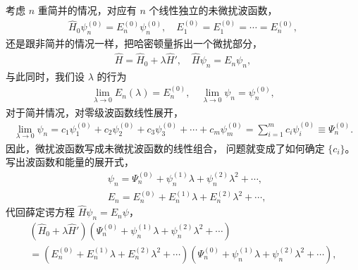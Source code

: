 考虑 $n$ 重简并的情况，对应有 $n$ 个线性独立的未微扰波函数，
\begin{align}
    \hat H_0 \psi_n^{(0)} = E_n^{(0)} \psi_n^{(0)}, \quad 
    E_1^{(0)} = E_1^{(0)} = \cdots = E_n^{(0)}, 
\end{align}
还是跟非简并的情况一样，把哈密顿量拆出一个微扰部分，
\begin{align}
    \hat H = \hat H_0 + \lambda \hat H', \quad \hat H \psi_n = E_n \psi_n, 
\end{align}
与此同时，我们设 $\lambda$ 的行为
\begin{align}
    \lim_{\lambda \rightarrow 0} E_n(\lambda) = E_n^{(0)}, \quad \lim_{\lambda \rightarrow 0} \psi_n = \psi_n^{(0)},
\end{align}
对于简并情况，对零级波函数线性展开，
\begin{align}
    \lim_{\lambda \rightarrow 0} \psi_n = c_1 \psi_1^{(0)} + c_2 \psi_2^{(0)} + c_3 \psi_3^{(0)} + \cdots + c_m\psi_m^{(0)} = \sum_{i=1}^{m} c_i\psi_i^{(0)}\equiv\Psi_n^{(0)}. 
\end{align}
因此，微扰波函数写成未微扰波函数的线性组合，
问题就变成了如何确定 $\{c_i\}$。
写出波函数和能量的展开式，
\begin{align}
    &\psi_n = \Psi_n^{(0)} + \psi_n^{(1)} \lambda + \psi_n^{(2)} \lambda^2 + \cdots ,\\
    &E_n = E_n^{(0)} + E_n^{(1)} \lambda + E_n^{(2)} \lambda^2 + \cdots ,
\end{align}
代回薛定谔方程 $\hat H \psi_n = E_n \psi$，
\begin{multline}
    (\hat H_0 + \lambda \hat H ') 
    \left(
        \Psi_n^{(0)} + \psi_n^{(1)} \lambda + \psi_n^{(2)} \lambda^2 + \cdots
    \right) \\
    = 
    \left(
        E_n^{(0)} + E_n^{(1)} \lambda + E_n^{(2)} \lambda^2 + \cdots
    \right)
    \left(
        \Psi_n^{(0)} + \psi_n^{(1)} \lambda + \psi_n^{(2)} \lambda^2 + \cdots
    \right), 
\end{multline}
